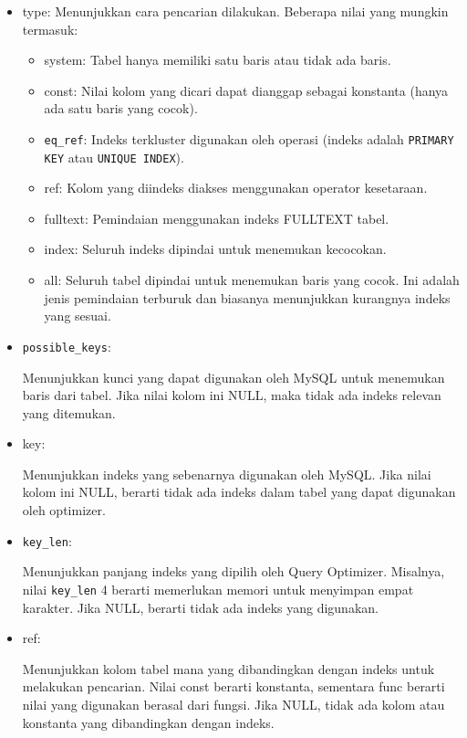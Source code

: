 \documentclass{article}
\begin{document}
\begin{itemize}
    \item type:
          Menunjukkan cara pencarian dilakukan. Beberapa nilai yang mungkin termasuk:
          \begin{itemize}
              \item system: Tabel hanya memiliki satu baris atau tidak ada baris.
              \item const: Nilai kolom yang dicari dapat dianggap sebagai konstanta (hanya ada satu baris yang cocok).
              \item \verb|eq_ref|: Indeks terkluster digunakan oleh operasi (indeks adalah \verb|PRIMARY KEY| atau \verb|UNIQUE INDEX|).
              \item ref: Kolom yang diindeks diakses menggunakan operator kesetaraan.
              \item fulltext: Pemindaian menggunakan indeks FULLTEXT tabel.
              \item index: Seluruh indeks dipindai untuk menemukan kecocokan.
              \item all: Seluruh tabel dipindai untuk menemukan baris yang cocok. Ini adalah jenis pemindaian terburuk dan biasanya menunjukkan kurangnya indeks yang sesuai.
          \end{itemize}

    \item \verb|possible_keys|:

          Menunjukkan kunci yang dapat digunakan oleh MySQL untuk menemukan baris dari tabel. Jika nilai kolom ini NULL, maka tidak ada indeks relevan yang ditemukan.

    \item key:

          Menunjukkan indeks yang sebenarnya digunakan oleh MySQL. Jika nilai kolom ini NULL, berarti tidak ada indeks dalam tabel yang dapat digunakan oleh optimizer.

    \item \verb|key_len|:

          Menunjukkan panjang indeks yang dipilih oleh Query Optimizer. Misalnya, nilai \verb|key_len| 4 berarti memerlukan memori untuk menyimpan empat karakter. Jika NULL, berarti tidak ada indeks yang digunakan.

    \item ref:

          Menunjukkan kolom tabel mana yang dibandingkan dengan indeks untuk melakukan pencarian. Nilai const berarti konstanta, sementara func berarti nilai yang digunakan berasal dari fungsi. Jika NULL, tidak ada kolom atau konstanta yang dibandingkan dengan indeks.


\end{itemize}
\end{document}
